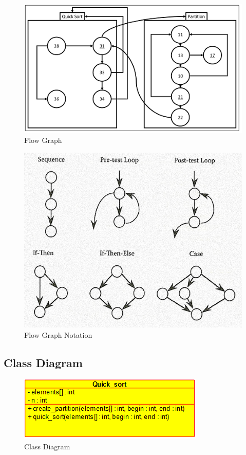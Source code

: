\documentclass[a4paper,12pt]{article}
\begin{document}
{{	\begin{figure}[h!]
		\centering
		\includegraphics[scale=0.80]{graph.png}
		\caption{Flow Graph}
		\label{Flow Graph}
	\end{figure}

	\begin{figure}[h!]
		\centering
		\includegraphics[scale=0.50]{flowgraph.png}
		\caption{Flow Graph Notation}
		\label{Flow Graph Notation}
	\end{figure}

	\newpage
	\subsection{Class Diagram}
	\begin{figure}[h!]
		\centering
		\includegraphics[scale=0.80]{quick-sort-class}
		\caption{Class Diagram}
		\label{Flow Graph}
	\end{figure}
	
}}
\end{document}
